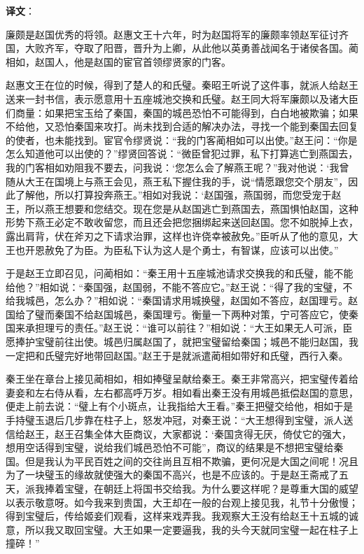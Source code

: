 \documentclass[12pt,UTF-8,openany,a4]{ctexbook}
\begin{document}
\newpage

\begin{Large}
   \noindent \textbf{译文}：
\end{Large}

\vspace{1em}

\begin{large}\yiwen
    
    廉颇是赵国优秀的将领。赵惠文王十六年，时为赵国将军的廉颇率领赵军征讨齐国，大败齐军，夺取了阳晋，晋升为上卿，从此他以英勇善战闻名于诸侯各国。蔺相如，赵国人，他是赵国的宦官首领缪贤家的门客。
    
    赵惠文王在位的时候，得到了楚人的和氏璧。秦昭王听说了这件事，就派人给赵王送来一封书信，表示愿意用十五座城池交换和氏璧。赵王同大将军廉颇以及诸大臣们商量：如果把宝玉给了秦国，秦国的城邑恐怕不可能得到，白白地被欺骗；如果不给他，又恐怕秦国来攻打。尚未找到合适的解决办法，寻找一个能到秦国去回复的使者，也未能找到。宦官令缪贤说：“我的门客蔺相如可以出使。”赵王问：“你是怎么知道他可以出使的？”缪贤回答说：“微臣曾犯过罪，私下打算逃亡到燕国去，我的门客相如劝阻我不要去，问我说：‘您怎么会了解燕王呢？”我对他说：‘我曾随从大王在国境上与燕王会见，燕王私下握住我的手，说“情愿跟您交个朋友”，因此了解他，所以打算投奔燕王。”相如对我说：‘赵国强，燕国弱，而您受宠于赵王，所以燕王想要和您结交。现在您是从赵国逃亡到燕国去，燕国惧怕赵国，这种形势下燕王必定不敢收留您，而且还会把您捆绑起来送回赵国。您不如脱掉上衣，露出肩背，伏在斧刃之下请求治罪，这样也许侥幸被赦免。”臣听从了他的意见，大王也开恩赦免了为臣。为臣私下认为这人是个勇士，有智谋，应该可以出使。”
    
    于是赵王立即召见，问蔺相如：“秦王用十五座城池请求交换我的和氏璧，能不能给他？”相如说：“秦国强，赵国弱，不能不答应它。”赵王说：“得了我的宝璧，不给我城邑，怎么办？”相如说：“秦国请求用城换璧，赵国如不答应，赵国理亏。赵国给了璧而秦国不给赵国城邑，秦国理亏。衡量一下两种对策，宁可答应它，使秦国来承担理亏的责任。”赵王说：“谁可以前往？”相如说：“大王如果无人可派，臣愿捧护宝璧前往出使。城邑归属赵国了，就把宝璧留给秦国；城邑不能归赵国，我一定把和氏璧完好地带回赵国。”赵王于是就派遣蔺相如带好和氏璧，西行入秦。
    
    秦王坐在章台上接见蔺相如，相如捧璧呈献给秦王。秦王非常高兴，把宝璧传着给妻妾和左右侍从看，左右都高呼万岁。相如看出秦王没有用城邑抵偿赵国的意思，便走上前去说：“璧上有个小斑点，让我指给大王看。”秦王把璧交给他，相如于是手持璧玉退后几步靠在柱子上，怒发冲冠，对秦王说：“大王想得到宝璧，派人送信给赵王，赵王召集全体大臣商议，大家都说：‘秦国贪得无厌，倚仗它的强大，想用空话得到宝璧，说给我们城邑恐怕不可能”，商议的结果是不想把宝璧给秦国。但是我认为平民百姓之间的交往尚且互相不欺骗，更何况是大国之间呢！况且为了一块璧玉的缘故就使强大的秦国不高兴，也是不应该的。于是赵王斋戒了五天，派我捧着宝璧，在朝廷上将国书交给我。为什么要这样呢？是尊重大国的威望以表示敬意呀。如今我来到贵国，大王却在一般的台观上接见我，礼节十分傲慢；得到宝璧后，传给姬妾们观看，这样来戏弄我。我观察大王没有给赵王十五城的诚意，所以我又取回宝璧。大王如果一定要逼我，我的头今天就同宝璧一起在柱子上撞碎！”
    

\end{large}
\end{document}
